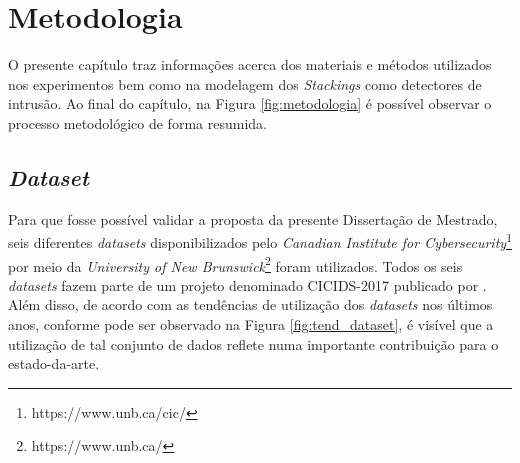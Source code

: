 

\chapter{Metodologia}

\label{cap-metodologia}

O presente capítulo traz informações acerca dos materiais e métodos utilizados nos experimentos bem como na modelagem dos \textit{Stackings} como detectores de intrusão. Ao final do capítulo, na Figura \ref{fig:metodologia} é possível observar o processo metodológico de forma resumida.

\section{\textit{Dataset}}
\label{secao-datasets}

Para que fosse possível validar a proposta da presente Dissertação de Mestrado, seis diferentes \textit{datasets} disponibilizados pelo \textit{Canadian Institute for Cybersecurity}\footnote{https://www.unb.ca/cic/} por meio da \textit{University of New Brunswick}\footnote{https://www.unb.ca/} foram utilizados. Todos os seis \textit{datasets} fazem parte de um projeto denominado CICIDS-2017 publicado por . Além disso, de acordo com as tendências de utilização dos \textit{datasets} nos últimos anos, conforme pode ser observado na Figura \ref{fig:tend_dataset}, é visível que a utilização de tal conjunto de dados reflete numa importante contribuição para o estado-da-arte.

